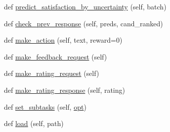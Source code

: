 \begin{DoxyCompactItemize}
def \hyperlink{classself__feeding_1_1self__feeding__agent_1_1SelfFeedingAgent_a9613b626ec2e4bbdeca8b1decc9d7513}{predict\+\_\+satisfaction\+\_\+by\+\_\+uncertainty} (self, batch)
\item 
def \hyperlink{classself__feeding_1_1self__feeding__agent_1_1SelfFeedingAgent_a7dc80f7fcb8270b3fb87ddff8848750d}{check\+\_\+prev\+\_\+response} (self, preds, cand\+\_\+ranked)
\item 
def \hyperlink{classself__feeding_1_1self__feeding__agent_1_1SelfFeedingAgent_a876feb626f411fd0a18fbce66a886764}{make\+\_\+action} (self, text, reward=0)
\item 
def \hyperlink{classself__feeding_1_1self__feeding__agent_1_1SelfFeedingAgent_abb5225edea055887a8ec2da2d02b7463}{make\+\_\+feedback\+\_\+request} (self)
\item 
def \hyperlink{classself__feeding_1_1self__feeding__agent_1_1SelfFeedingAgent_abc842083fdfd34983ed64bd7dc8d8b4a}{make\+\_\+rating\+\_\+request} (self)
\item 
def \hyperlink{classself__feeding_1_1self__feeding__agent_1_1SelfFeedingAgent_a36a79f932c2ba47838596bc88c26625d}{make\+\_\+rating\+\_\+response} (self, rating)
\item 
def \hyperlink{classself__feeding_1_1self__feeding__agent_1_1SelfFeedingAgent_ab500915eed5d30c7f2672f9db4ef32cc}{set\+\_\+subtasks} (self, \hyperlink{classparlai_1_1core_1_1torch__agent_1_1TorchAgent_a785bb920cf8c8afc3e9bf6a8b77e335a}{opt})
\item 
def \hyperlink{classself__feeding_1_1self__feeding__agent_1_1SelfFeedingAgent_a50e6f81560e522b6178f913bb3f1258a}{load} (self, path)
\end{DoxyCompactItemize}
